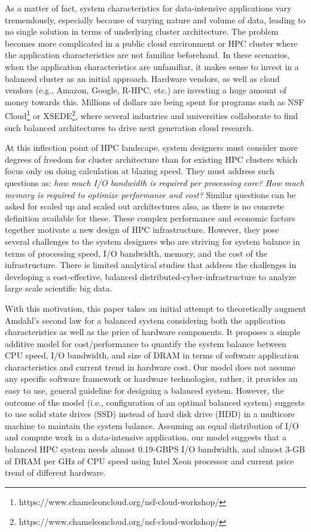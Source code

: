 \documentclass[journal]{IEEEtran}
\begin{document}
As a matter of fact, system characteristics for data-intensive applications vary tremendously, especially because of varying nature and volume of data, leading to no single solution in terms of underlying cluster architecture. The problem becomes more complicated in a public cloud environment or HPC cluster where the application characteristics are not familiar beforehand. In these scenarios, when the application characteristics are unfamiliar, it makes sense to invest in a balanced cluster as an initial approach. Hardware vendors, as well as cloud vendors (e.g., Amazon, Google, R-HPC, etc.) are investing a huge amount of money towards this. Millions of dollars are being spent for programs such as NSF Cloud\footnote{https://www.chameleoncloud.org/nsf-cloud-workshop/} or XSEDE\footnote{https://www.chameleoncloud.org/nsf-cloud-workshop/}, where several industries and universities collaborate to find such balanced architectures to drive next generation cloud research. 

At this inflection point of HPC landscape, system designers must consider more degrees of freedom for cluster architecture than for existing HPC clusters which focus only on doing calculation at blazing speed. They must address such questions as: \textit{how much I/O bandwidth is required per processing core?} \textit{How much memory is required to optimize performance and cost?}  Similar questions can be asked for scaled up and scaled out architectures also, as there is no concrete definition available for these. These complex performance and economic factors together motivate a new design of HPC infrastructure. However, they pose several challenges to the system designers who are striving for system balance in terms of processing speed, I/O bandwidth, memory, and the cost of the infrastructure. There is limited analytical studies that address the challenges in developing a cost-effective, balanced distributed-cyber-infrastructure to analyze large scale scientific big data.
 
With this motivation, this paper takes an initial attempt to theoretically augment Amdahl's second law for a balanced system considering both the application characteristics as well as the price of hardware components. It proposes a simple additive model 
for cost/performance to quantify the system balance between CPU speed, I/O bandwidth, and size of DRAM in terms of software application characteristics and current trend in hardware cost. Our model does not assume any specific software framework or hardware technologies, rather, it provides an easy to use, general guideline for designing a balanced system. However, the outcome of the model (i.e., configuration of an optimal balanced system) suggests to use solid state drives (SSD) instead of hard disk drive (HDD) in a multicore machine to maintain the system balance. Assuming an equal distribution of I/O  and compute work in a data-intensive application, our model suggests that a balanced HPC system needs almost 0.19-GBPS I/O bandwidth, and almost 3-GB of DRAM per GHz of CPU speed using Intel Xeon processor  and current price trend of different hardware. 
\end{document}
